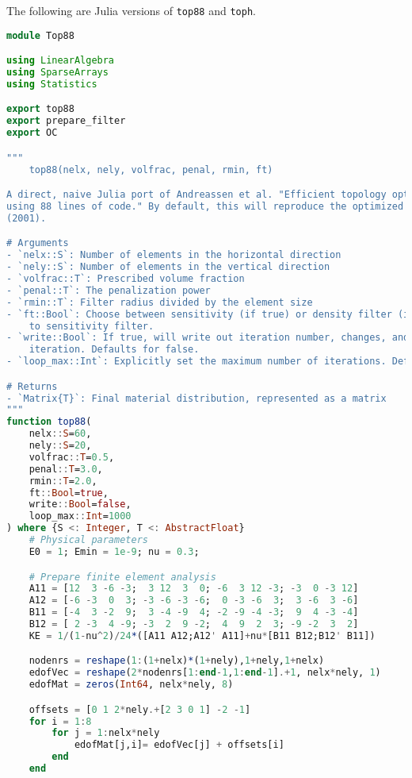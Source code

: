 The following are Julia versions of \texttt{top88} and \texttt{toph}.

\begin{lstlisting}[language=Julia, title=\texttt{top88.jl}, label={lst:top88}]
module Top88

using LinearAlgebra
using SparseArrays
using Statistics

export top88
export prepare_filter
export OC

"""
    top88(nelx, nely, volfrac, penal, rmin, ft)

A direct, naive Julia port of Andreassen et al. "Efficient topology optimization in MATLAB
using 88 lines of code." By default, this will reproduce the optimized MBB beam from Sigmund
(2001).

# Arguments
- `nelx::S`: Number of elements in the horizontal direction
- `nely::S`: Number of elements in the vertical direction
- `volfrac::T`: Prescribed volume fraction
- `penal::T`: The penalization power
- `rmin::T`: Filter radius divided by the element size
- `ft::Bool`: Choose between sensitivity (if true) or density filter (if false). Defaults
    to sensitivity filter.
- `write::Bool`: If true, will write out iteration number, changes, and density for each
    iteration. Defaults for false.
- `loop_max::Int`: Explicitly set the maximum number of iterations. Defaults to 1000.

# Returns
- `Matrix{T}`: Final material distribution, represented as a matrix
"""
function top88(
    nelx::S=60,
    nely::S=20,
    volfrac::T=0.5,
    penal::T=3.0,
    rmin::T=2.0,
    ft::Bool=true,
    write::Bool=false,
    loop_max::Int=1000
) where {S <: Integer, T <: AbstractFloat}
    # Physical parameters
    E0 = 1; Emin = 1e-9; nu = 0.3;

    # Prepare finite element analysis
    A11 = [12  3 -6 -3;  3 12  3  0; -6  3 12 -3; -3  0 -3 12]
    A12 = [-6 -3  0  3; -3 -6 -3 -6;  0 -3 -6  3;  3 -6  3 -6]
    B11 = [-4  3 -2  9;  3 -4 -9  4; -2 -9 -4 -3;  9  4 -3 -4]
    B12 = [ 2 -3  4 -9; -3  2  9 -2;  4  9  2  3; -9 -2  3  2]
    KE = 1/(1-nu^2)/24*([A11 A12;A12' A11]+nu*[B11 B12;B12' B11])

    nodenrs = reshape(1:(1+nelx)*(1+nely),1+nely,1+nelx)
    edofVec = reshape(2*nodenrs[1:end-1,1:end-1].+1, nelx*nely, 1)
    edofMat = zeros(Int64, nelx*nely, 8)

    offsets = [0 1 2*nely.+[2 3 0 1] -2 -1]
    for i = 1:8
        for j = 1:nelx*nely
            edofMat[j,i]= edofVec[j] + offsets[i]
        end
    end


\end{lstlisting}

